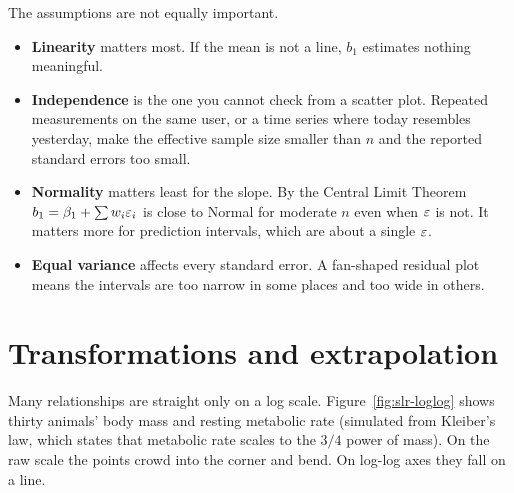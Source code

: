 The assumptions are not equally important.
\begin{itemize}
  \item \textbf{Linearity} matters most. If the mean is not a line, $b_1$
  estimates nothing meaningful.
  \item \textbf{Independence} is the one you cannot check from a scatter plot.
  Repeated measurements on the same user, or a time series where today
  resembles yesterday, make the effective sample size smaller than $n$ and the
  reported standard errors too small.
  \item \textbf{Normality} matters least for the slope. By the Central Limit
  Theorem $b_1 = \beta_1 + \sum w_i\varepsilon_i$ is close to Normal for moderate $n$
  even when $\varepsilon$ is not. It matters more for prediction intervals, which are
  about a single $\varepsilon$.
  \item \textbf{Equal variance} affects every standard error. A fan-shaped
  residual plot means the intervals are too narrow in some places and too wide
  in others.
\end{itemize}

\section{Transformations and extrapolation}
\label{sec:slr-transform}

Many relationships are straight only on a log scale. Figure~\ref{fig:slr-loglog}
shows thirty animals' body mass and resting metabolic rate (simulated from
Kleiber's law, which states that metabolic rate scales to the $3/4$ power of mass). On the raw scale the points crowd into the corner and bend. On
log-log axes they fall on a line.

